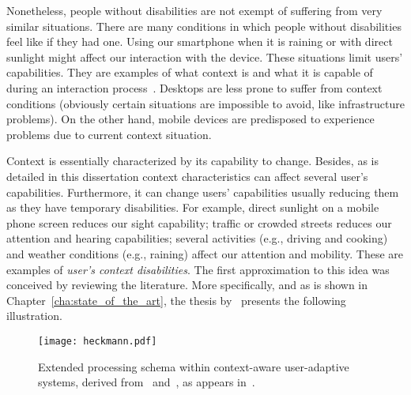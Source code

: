 % 

Nonetheless, people without disabilities are not exempt of suffering from very
similar situations. There are many conditions in which people without 
disabilities feel like if they had one. Using our smartphone when it is raining 
or with direct sunlight might affect our interaction with the device. These 
situations limit users' capabilities. They are examples of what context is and 
what it is capable of during an interaction process~\citep{dey_understanding_2001}. 
Desktops are less prone to suffer from context conditions (obviously certain 
situations are impossible to avoid, like infrastructure problems). On the other 
hand, mobile devices are predisposed to experience problems due to current context 
situation. 

Context is essentially characterized by its capability to change. Besides, as is 
detailed in this dissertation context characteristics can affect several user's 
capabilities. Furthermore, it can change users' capabilities usually
reducing them as they have temporary disabilities. For example, direct sunlight
on a mobile phone screen reduces our sight capability; traffic or crowded streets
reduces our attention and hearing capabilities; several activities (e.g., driving
and cooking) and weather conditions (e.g., raining) affect our attention and
mobility. These are examples of \textit{user's context disabilities}. The first
approximation to this idea was conceived by reviewing the literature. More
specifically, and as is shown in Chapter~\ref{cha:state_of_the_art}, the
thesis by~\citet{heckmann_ubiquitous_2005} presents the following illustration.

\begin{figure}[H]
\centering
\texttt{[image: heckmann.pdf]}
\caption{Extended processing schema within context-aware user-adaptive systems, 
derived from~\citep{jameson_modelling_2001} and~\citep{kleinbauer_specter_user_centered_2003},
as appears in~\citep{heckmann_ubiquitous_2005}.}
\label{fig:heckmann}
\end{figure}

